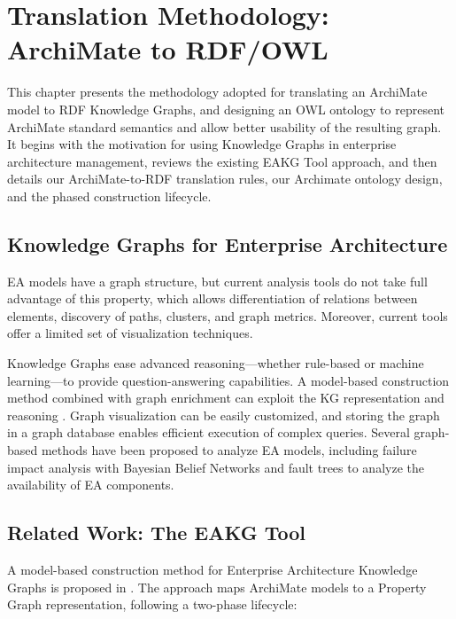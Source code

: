 \chapter{Translation Methodology: ArchiMate to RDF/OWL}
\label{chap:translation}

This chapter presents the methodology adopted for translating an ArchiMate model to RDF Knowledge Graphs, and designing an OWL ontology\parencite{w3c-owl} to represent ArchiMate standard semantics and allow better usability of the resulting graph. It begins with the motivation for using Knowledge Graphs in enterprise architecture management, reviews the existing EAKG Tool approach, and then details our ArchiMate-to-RDF translation rules, our Archimate ontology design, and the phased construction lifecycle.

\section{Knowledge Graphs for Enterprise Architecture}
\label{sec:why-kg}

EA models have a graph structure, but current analysis tools do not take full advantage of this property, which allows differentiation of relations between elements, discovery of paths, clusters, and graph metrics. Moreover, current tools offer a limited set of visualization techniques.

Knowledge Graphs ease advanced reasoning---whether rule-based or machine learning---to provide question-answering capabilities. A model-based construction method combined with graph enrichment can exploit the KG representation and reasoning \parencite{glaser2022model}. Graph visualization can be easily customized, and storing the graph in a graph database enables efficient execution of complex queries. Several graph-based methods have been proposed to analyze EA models, including failure impact analysis with Bayesian Belief Networks and fault trees to analyze the availability of EA components.

\section{Related Work: The EAKG Tool}
\label{sec:eakg-tool}

A model-based construction method for Enterprise Architecture Knowledge Graphs is proposed in \parencite{glaser2022model}. The approach maps ArchiMate models to a Property Graph representation, following a two-phase lifecycle:

